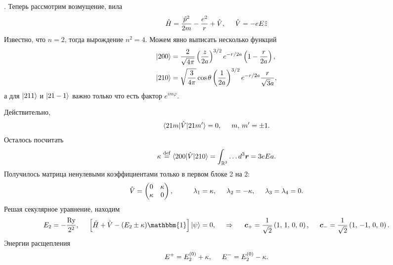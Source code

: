 
.
Теперь рассмотрим возмущение, вила
\begin{equation*}
    \hat{H} = \frac{\hat{p}^2}{2m} - \frac{e^2}{r} + \hat{V},
    \hspace{5 mm} 
    \hat{V} = - e E \hat{z}
\end{equation*}
Известно, что $n=2$, тогда вырождение $n^2 = 4$. Можем явно выписать несколько функций
\begin{align*}
    \left| 200 \right\rangle &= \frac{2}{\sqrt{4 \pi}} \left(\frac{z}{2a}\right)^{3/2} e^{-r/2a} \left(
        1 - \frac{r}{2a}
    \right), \\
    \left| 210 \right\rangle &= \sqrt{\frac{3}{4\pi}} \cos \theta \left(\frac{1}{2a}\right)^{3/2} e^{-r/2a} \frac{r}{\sqrt{3} a}, 
\end{align*}
а для $\left| 211 \right\rangle$ и $\left| 21-1 \right\rangle$ важно только что есть фактор $e^{im\varphi}$.

Действительно,
\begin{equation*}
    \bk{21m}[\hat{V}]{21m'} = 0,
    \hspace{5 mm} 
    m,\, m' = \pm 1.
\end{equation*}
Осталось посчитать
\begin{equation*}
    \kappa \overset{\mathrm{def}}{=}  \bk{200}[\hat{V}]{210} = \int_{\mathbb{R}^3}
        \ldots
    d^3 \vc{r} = 3 e E {a}.
\end{equation*}
Получилось матрица  ненулевыми коэффициентами только в первом блоке 2 на 2:
\begin{equation*}
    \hat{V} = \begin{pmatrix}
        0 & \kappa  \\
        \kappa & 0  \\
    \end{pmatrix},
    \hspace{10 mm} 
    \lambda_1 = \kappa, \hspace{5 mm} 
    \lambda_2 = - \kappa,
    \hspace{5 mm}   
    \lambda_3 =  \lambda_4 = 0.
\end{equation*}
Решая секулярное уравнение, находим
\begin{equation*}
    E_2 =  - \frac{\text{Ry}}{2^2},
    \hspace{5 mm} 
    \left[\hat{H} + \hat{V} - (E_2 \pm \kappa) \mathbbm{1}\right] \ket{\psi} = 0,
    \hspace{0.5cm} \Rightarrow \hspace{0.5cm}
    \vc{c}_+ = \frac{1}{\sqrt{2}} \left(1,\, 1,\, 0,\, 0\right),
    \hspace{5 mm} 
    \vc{c}_- = \frac{1}{\sqrt{2}} \left(1,\, -1,\, 0,\, 0\right).
\end{equation*}
Энергии расщепления
\begin{equation*}
    E^+ = E_2^{(0)} + \kappa,
    \hspace{5 mm} 
    E^- = E_{2}^{(0)} -\kappa.
\end{equation*}


